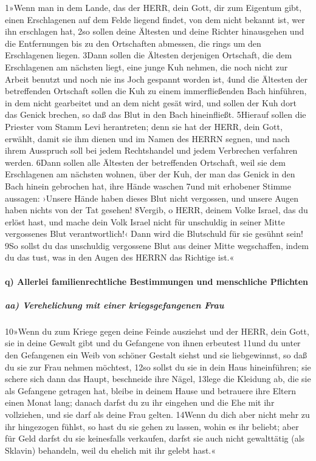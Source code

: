 1»Wenn man in dem Lande, das der HERR, dein Gott, dir zum Eigentum gibt,
einen Erschlagenen auf dem Felde liegend findet, von dem nicht bekannt
ist, wer ihn erschlagen hat, 2so sollen deine Ältesten und deine Richter
hinausgehen und die Entfernungen bis zu den Ortschaften abmessen, die
rings um den Erschlagenen liegen. 3Dann sollen die Ältesten derjenigen
Ortschaft, die dem Erschlagenen am nächsten liegt, eine junge Kuh
nehmen, die noch nicht zur Arbeit benutzt und noch nie ins Joch gespannt
worden ist, 4und die Ältesten der betreffenden Ortschaft sollen die Kuh
zu einem immerfließenden Bach hinführen, in dem nicht gearbeitet und an
dem nicht gesät wird, und sollen der Kuh dort das Genick brechen, so daß
das Blut in den Bach hineinfließt. 5Hierauf sollen die Priester vom
Stamm Levi herantreten; denn sie hat der HERR, dein Gott, erwählt, damit
sie ihm dienen und im Namen des HERRN segnen, und nach ihrem Ausspruch
soll bei jedem Rechtshandel und jedem Verbrechen verfahren werden. 6Dann
sollen alle Ältesten der betreffenden Ortschaft, weil sie dem
Erschlagenen am nächsten wohnen, über der Kuh, der man das Genick in den
Bach hinein gebrochen hat, ihre Hände waschen 7und mit erhobener Stimme
aussagen: ›Unsere Hände haben dieses Blut nicht vergossen, und unsere
Augen haben nichts von der Tat gesehen! 8Vergib, o HERR, deinem Volke
Israel, das du erlöst hast, und mache dein Volk Israel nicht für
unschuldig in seiner Mitte vergossenes Blut verantwortlich!‹ Dann wird
die Blutschuld für sie gesühnt sein! 9So sollst du das unschuldig
vergossene Blut aus deiner Mitte wegschaffen, indem du das tust, was in
den Augen des HERRN das Richtige ist.«

\hypertarget{q-allerlei-familienrechtliche-bestimmungen-und-menschliche-pflichten}{%
\paragraph{q) Allerlei familienrechtliche Bestimmungen und menschliche
Pflichten}\label{q-allerlei-familienrechtliche-bestimmungen-und-menschliche-pflichten}}

\hypertarget{aa-verehelichung-mit-einer-kriegsgefangenen-frau}{%
\subparagraph{aa) Verehelichung mit einer kriegsgefangenen
Frau}\label{aa-verehelichung-mit-einer-kriegsgefangenen-frau}}

10»Wenn du zum Kriege gegen deine Feinde ausziehst und der HERR, dein
Gott, sie in deine Gewalt gibt und du Gefangene von ihnen erbeutest
11und du unter den Gefangenen ein Weib von schöner Gestalt siehst und
sie liebgewinnst, so daß du sie zur Frau nehmen möchtest, 12so sollst du
sie in dein Haus hineinführen; sie schere sich dann das Haupt,
beschneide ihre Nägel, 13lege die Kleidung ab, die sie als Gefangene
getragen hat, bleibe in deinem Hause und betrauere ihre Eltern einen
Monat lang; danach darfst du zu ihr eingehen und die Ehe mit ihr
vollziehen, und sie darf als deine Frau gelten. 14Wenn du dich aber
nicht mehr zu ihr hingezogen fühlst, so hast du sie gehen zu lassen,
wohin es ihr beliebt; aber für Geld darfst du sie keinesfalls verkaufen,
darfst sie auch nicht gewalttätig (als Sklavin) behandeln, weil du
ehelich mit ihr gelebt hast.«

